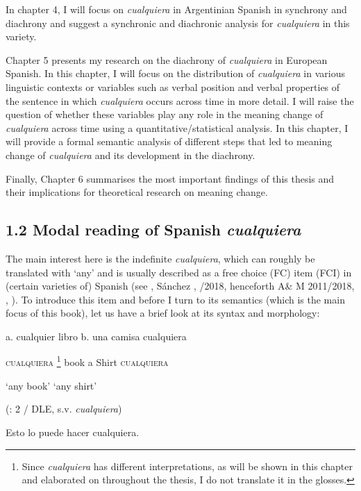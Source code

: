 \documentclass[output=paper]{langscibook}
\begin{document}
  In chapter 4, I will focus on \textit{cualquiera} in Argentinian Spanish in synchrony and diachrony and suggest a synchronic and diachronic analysis for \textit{cualquiera} in this variety. 

  Chapter 5 presents my research on the diachrony of \textit{cualquiera} in European Spanish. In this chapter, I will focus on the distribution of \textit{cualquiera} in various linguistic contexts or variables such as verbal position and verbal properties of the sentence in which \textit{cualquiera} occurs across time in more detail. I will raise the question of whether these variables play any role in the meaning change of \textit{cualquiera} across time using a quantitative/statistical analysis. In this chapter, I will provide a formal semantic analysis of different steps that led to meaning change of \textit{cualquiera} and its development in the diachrony.

  Finally, Chapter 6 summarises the most important findings of this thesis and their implications for theoretical research on meaning change.

\subsection{1.2 Modal reading of Spanish \textit{cualquiera}}

The main interest here is the indefinite \textit{cualquiera}, which can roughly be translated with ‘any’ and is usually described as a free choice (FC) item (FCI) in (certain varieties of) Spanish (see \citealt{Brucart1999}, Sánchez \citealt{López1999}, \citealt{Alonso-OvalleMenéndez-Benito2011}/2018, henceforth A\& M 2011/2018, \citealt{Rivero2011}, \citealt{Eberenz2000}). To introduce this item and before I turn to its semantics (which is the main focus of this book), let us have a brief look at its syntax and morphology:

  a.  cualquier  libro  b.  una  camisa  cualquiera

    \textsc{cualquiera}\textstyleFootnoteSymbol{} \footnote{ \textrm{Since} \textrm{\textit{cualquiera}} \textrm{has different interpretations, as will be shown in this chapter and elaborated on throughout the thesis, I do not translate it in the glosses.}}  book    a  Shirt   \textsc{cualquiera}

    ‘any book’    ‘any shirt’

         (\citealt{AloniEtAl2011}: 2 / DLE, s.v. \textit{cualquiera})

    Esto  lo  puede  hacer  cualquiera.  
\end{document}
